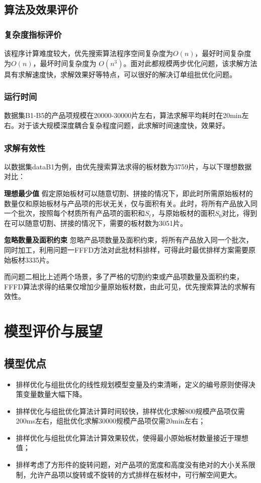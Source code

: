 \documentclass[bwprint]{gmcmthesis}
\begin{document}
\subsection{算法及效果评价}

\subsubsection{复杂度指标评价}  

该程序计算难度较大，优先搜索算法程序空间复杂度为$O(n)$，最好时间复杂度为$O(n)$，最坏时间复杂度为 $ O(n^3) $。面对此都规模两步优化问题，该求解方法具有求解速度快，求解效果好等特点，可以很好的解决订单组批优化问题。

	
\subsubsection{运行时间}
	 
	数据集B1-B5的产品项规模在20000-30000片左右，算法求解平均耗时在20min左右。对于该大规模深度耦合复杂程度问题，此求解时间速度快，效果好。
		
\subsubsection{求解有效性}

以数据集dataB1为例，由优先搜索算法求得的板材数为3759片，与以下理想数据对比：

\textbf{理想最少值} \quad 假定原始板材可以随意切割、拼接的情况下，即此时所需原始板材的数量仅和原始板材与产品项的形状无关，仅与面积有关。此时，将所有产品放入同一个批次，按照每个材质所有产品项的面积和$S_t$，与原始板材的面积$S_0$对比，得到在可以随意切割、拼接的情况下，需要的板材数为3051片。

\textbf{忽略数量及面积约束} \quad 忽略产品项数量及面积约束，将所有产品放入同一个批次，同时加工，利用问题一FFFD方法对此批材料排样，可得此时最优排样方案需要原始板材3335片。


而问题二相比上述两个场景，多了严格的切割约束或产品项数量及面积约束，FFFD算法求得的结果仅增加少量原始板材数，由此可见，优先搜索算法的求解有效性。



\section{模型评价与展望}
\subsection{模型优点}
\begin{itemize}
    \item 排样优化与组批优化的线性规划模型变量及约束清晰，定义的编号原则使得决策变量数量大幅下降。
    \item 排样优化与组批优化算法计算时间较快，排样优化求解800规模产品项仅需200ms左右，组批优化求解30000规模产品项仅需20min左右；
    \item 排样优化与组批优化算法计算效果较优，使得最小原始板材数量接近于理想值；
    \item 排样考虑了方形件的旋转问题，对产品项的宽度和高度没有绝对的大小关系限制，允许产品项以旋转或不旋转的方式排样在板材中，可行解空间更大。
\end{itemize}
\end{document}
